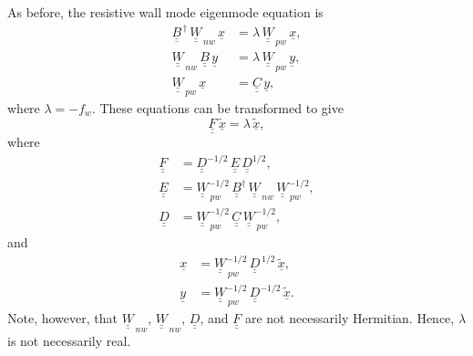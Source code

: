 \documentclass[12pt,prb,aps,notitlepage]{revtex4-1}
\begin{document}
As before, the resistive wall mode eigenmode equation is 
\begin{align}
\underline{\underline{B}}^{\,\dag}\,\underline{\underline{W}}_{\,nw}\,\underline{x}&=\lambda\,\underline{\underline{W}}_{\,pw}\,\underline{x},\\[0.5ex]
\underline{\underline{W}}_{\,nw}\,\underline{\underline{B}}\,\underline{y} &=\lambda\,\underline{\underline{W}}_{\,pw}\,\underline{y},\\[0.5ex]
\underline{\underline{W}}_{\,pw}\,\underline{x}&= 
\underline{\underline{C}}\,\underline{y},
\end{align}
where $\lambda=-f_w$. 
These equations can be transformed to give
\begin{equation}
\underline{\underline{F}}\,\underline{\tilde{x}}= \lambda\,\underline{\tilde{x}},
\end{equation}
where
\begin{align}
\underline{\underline{F}} &= \underline{\underline{D}}^{-1/2}\,\underline{\underline{E}}\,\underline{\underline{D}}^{1/2},\\[0.5ex]
\underline{\underline{E}} &= \underline{\underline{W}}_{\,pw}^{-1/2}\,\underline{\underline{B}}^\dag\,\underline{\underline{W}}_{\,nw}\, \underline{\underline{W}}_{\,pw}^{-1/2},\\[0.5ex]
\underline{\underline{D}} &=  \underline{\underline{W}}_{\,pw}^{-1/2} \,\underline{\underline{C}} \,\underline{\underline{W}}_{\,pw}^{-1/2},
\end{align}
and
\begin{align}
\underline{x} &= \underline{\underline{W}}_{\,pw}^{-1/2}\, \underline{\underline{D}}^{\,1/2}\,\underline{\tilde{x}},\\[0.5ex]
\underline{y} &= \underline{\underline{W}}_{\,pw}^{-1/2}\, \underline{\underline{D}}^{-1/2}\,\underline{\tilde{x}}.
\end{align}
Note, however, that $\underline{\underline{W}}_{\,nw}$, $\underline{\underline{W}}_{\,nw}$, $ \underline{\underline{D}}$, and $\underline{\underline{F}}$
are not necessarily Hermitian. Hence, $\lambda$ is  not necessarily real.
\end{document}

